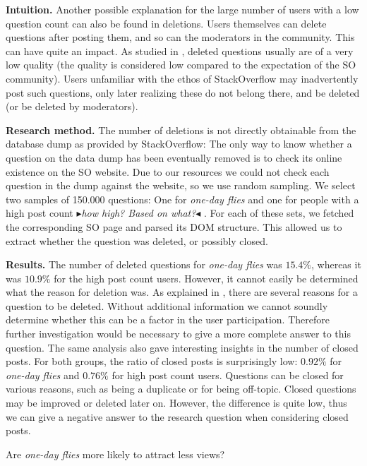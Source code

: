 \documentclass[conference]{IEEEtran}
\newcommand{\nb}[3]{
  \fcolorbox{black}{#2}{\bfseries\sffamily\scriptsize#1}
    {\sf\small$\blacktriangleright$\textit{#3}$\blacktriangleleft$}
}
\newcommand\AB[1]{\nb{alberto}{cyan}{#1}}
\newcommand\odf{\emph{one-day flies}\xspace}
\begin{document}
\textbf{Intuition.} Another possible explanation for the large number of users
with a low question count can also be found in deletions. Users themselves can
delete questions after posting them, and so can the moderators in the
community. This can have quite an impact. As studied in \cite{correa2014chaff},
deleted questions usually are of a very low quality (the quality is considered
low compared to the expectation of the SO community). Users unfamiliar with the
ethos of StackOverflow may inadvertently post such questions, only later
realizing these do not belong there, and be deleted (or be deleted by
moderators). 

\textbf{Research method.} The number of deletions is not directly obtainable
from the database dump as provided by StackOverflow: The only way to know
whether a question on the data dump has been eventually removed is to check its
online existence on the SO website. Due to our resources we could not check
each question in the dump against the website, so we use random sampling. We
select two samples of 150.000 questions: One for \odf and one for people with a
high post count \AB{how high? Based on what?}. For each of these sets, we
fetched the corresponding SO page and parsed its DOM structure. This allowed us
to extract whether the question was deleted, or possibly closed.

\textbf{Results.} The number of deleted questions for \odf was $15.4\%$,
whereas it was $10.9\%$ for the high post count users. However, it cannot
easily be determined what the reason for deletion was. As explained in
\cite{correa2014chaff}, there are several reasons for a question to be deleted.
Without additional information we cannot soundly determine whether this can be
a factor in the user participation. Therefore further investigation would be
necessary to give a more complete answer to this question.  The same analysis
also gave interesting insights in the number of closed posts.  For both groups,
the ratio of closed posts is surprisingly low: $0.92\%$ for \odf and $0.76\%$
for high post count users. Questions can be closed for various reasons, such as
being a duplicate or for being off-topic. Closed questions may be improved or
deleted later on. However, the difference is quite low, thus we can give a 
negative answer to the research question when considering closed posts.\\ 


\begin{tcolorbox}[size=fbox,title=RQ4: View Count]
Are \odf more likely to attract less views? 
\end{tcolorbox}
\end{document}
